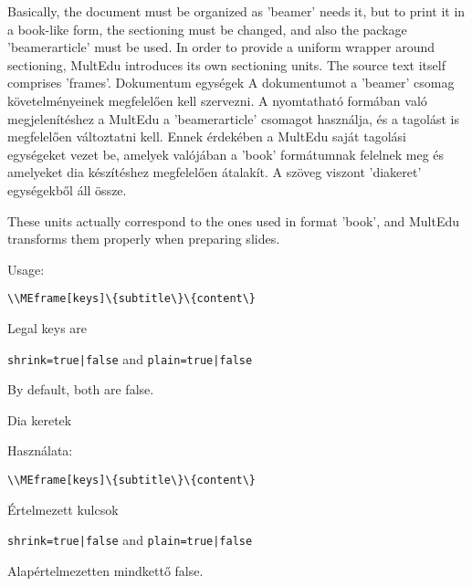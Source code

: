 



{
Basically, the document must be organized as 'beamer' needs it,
but to print it in a book-like form, the sectioning must be changed,
and also the package 'beamerarticle' must be used.
In order to provide a uniform wrapper around sectioning, \gls{MultEdu} introduces
its own sectioning units. The source text itself comprises 'frames'.
}
{Dokumentum egységek}
{
A dokumentumot a 'beamer' csomag követelményeinek megfelelően kell szervezni.
A nyomtatható formában való megjelenítéshez a \gls{MultEdu}  a 'beamerarticle' csomagot használja,
és a tagolást is megfelelően változtatni kell.
Ennek érdekében a \gls{MultEdu} saját tagolási egységeket vezet be, amelyek valójában
a 'book' formátumnak felelnek meg és amelyeket dia készítéshez megfelelően átalakít. A szöveg viszont 'diakeret' egységekből áll össze.
}

{
These units actually correspond to the ones used in format 'book',
and \gls{MultEdu} transforms them properly when preparing slides.

Usage:\par
\noindent\lstinline|\\MEframe[keys]\{subtitle\}\{content\}|

Legal keys are 

\noindent\lstinline!shrink=true|false! and \lstinline!plain=true|false!

By default, both are false.
}
{Dia keretek}
{

Használata:\par
\noindent\lstinline|\\MEframe[keys]\{subtitle\}\{content\}|

Értelmezett kulcsok 

\noindent\lstinline!shrink=true|false! and \lstinline!plain=true|false!

Alapértelmezetten mindkettő false.
}



